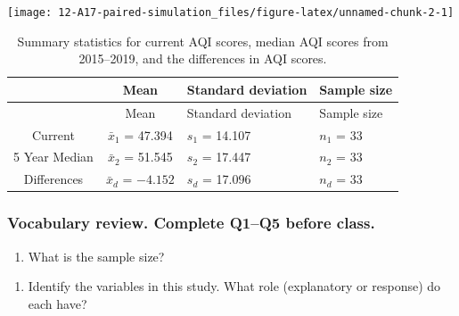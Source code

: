 \documentclass[
]{report}
\providecommand{\tightlist}{%
  \setlength{\itemsep}{0pt}\setlength{\parskip}{0pt}}
\begin{document}
\vspace{.05in}

\begin{center}\texttt{[image: 12-A17-paired-simulation\_files/figure-latex/unnamed-chunk-2-1]} \end{center}

\vspace{.2in}

\begin{longtable}[]{@{}ccll@{}}
\caption{Summary statistics for current AQI scores, median AQI scores from 2015--2019, and the differences in AQI scores.}\tabularnewline
\toprule
& Mean & Standard deviation & Sample size \\
\midrule
\endfirsthead
\toprule
& Mean & Standard deviation & Sample size \\
\midrule
\endhead
Current & \(\bar{x}_1\) = 47.394 & \(s_1\) = 14.107 & \(n_1\) = 33 \\
5 Year Median & \(\bar{x}_2\) = 51.545 & \(s_2\) = 17.447 & \(n_2\) = 33 \\
Differences & \(\bar{x}_d\) = \(-4.152\) & \(s_d\) = 17.096 & \(n_d\) = 33 \\
\bottomrule
\end{longtable}

\newpage

\hypertarget{vocabulary-review.-complete-q1q5-before-class.}{%
\subsubsection*{Vocabulary review. Complete Q1--Q5 before class.}\label{vocabulary-review.-complete-q1q5-before-class.}}

\begin{enumerate}
\def\labelenumi{\arabic{enumi}.}
\tightlist
\item
  What is the sample size?
\end{enumerate}

\vspace{0.3in}

\begin{enumerate}
\def\labelenumi{\arabic{enumi}.}
\setcounter{enumi}{1}
\tightlist
\item
  Identify the variables in this study. What role (explanatory or response) do each have?
\end{enumerate}

\vspace{.5in}
\end{document}
